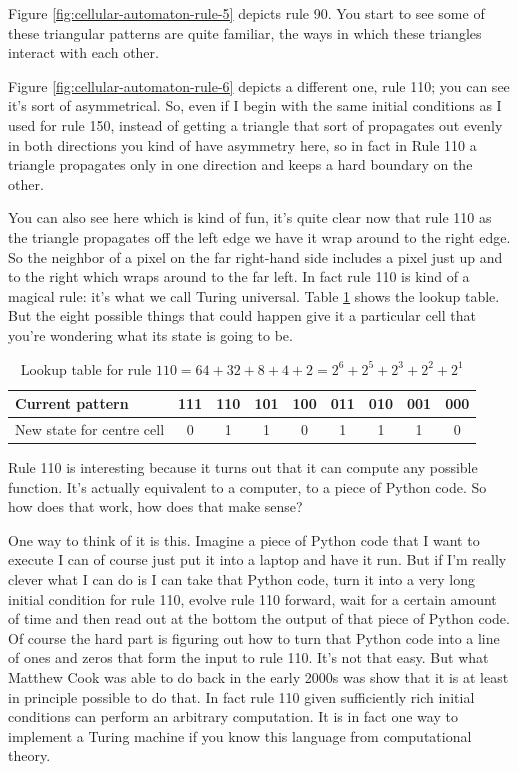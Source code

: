 \documentclass[]{article}
\begin{document}
Figure \ref{fig:cellular-automaton-rule-5} depicts rule 90.
You start to see some of these triangular patterns are quite familiar, the ways in which these triangles interact with each other.

Figure \ref{fig:cellular-automaton-rule-6} depicts a different one,
rule 110; you can see it's sort of asymmetrical.
So, even if I begin with the same initial conditions as I used for rule 150, instead of getting a triangle that sort of propagates out evenly in both directions
you kind of have asymmetry here, so in fact in Rule 110 a triangle propagates only in one direction and keeps a hard boundary on the other.

You can also see here which is kind of fun, it's quite clear now that rule 110 as the triangle propagates off the left edge we have it wrap around to the right edge.
So the neighbor of a pixel on the far right-hand side includes a pixel just up and to the right which wraps around to the far left.
In fact rule 110 is kind of a magical rule: it's what we call Turing universal.
Table \ref{table:rule-110} shows the lookup table. But the eight possible things that could happen give it a particular cell that you're wondering what its state is going to be.
\begin{table}[H]
	\caption[Lookup table for rule 110]{Lookup table for rule $110 = 64 + 32 + 8 + 4 + 2 = 2^6 + 2^5 + 2^3 + 2^2 +2^1$}\label{table:rule-110}
	\begin{tabular}{|l|c|c|c|c|c|c|c|c|}\hline
		Current pattern&111&110&101&100&011&010&001&000\\ \hline
		New state for centre cell&0&1&1&0&1&1&1&0\\ \hline
	\end{tabular}
\end{table}


Rule 110 is interesting because it turns out that it can compute any possible function. 
It's actually equivalent to a computer, to a piece of Python code.
So how does that work, how does that make sense?

One way to think of it is this. Imagine a piece of Python code that I want to execute I can of course just put it into a laptop and have it run. 
But if I'm really clever what I can do is I can take that Python code, turn it into a very long initial condition for rule 110, evolve rule 110 forward, wait for a certain amount of time and then read out at the bottom the output of that piece of Python code.
Of course the hard part is figuring out how to turn that Python code into a line of ones and zeros that form the input to rule 110.
It's not that easy.
But what Matthew Cook was able to do back in the early 2000s
was show that it is at least in principle possible to do that.\cite{cook2004universality}
In fact rule 110 given sufficiently rich initial conditions can perform an arbitrary computation.
It is in fact one way to implement a Turing machine if you know this language from computational theory.
\end{document}
